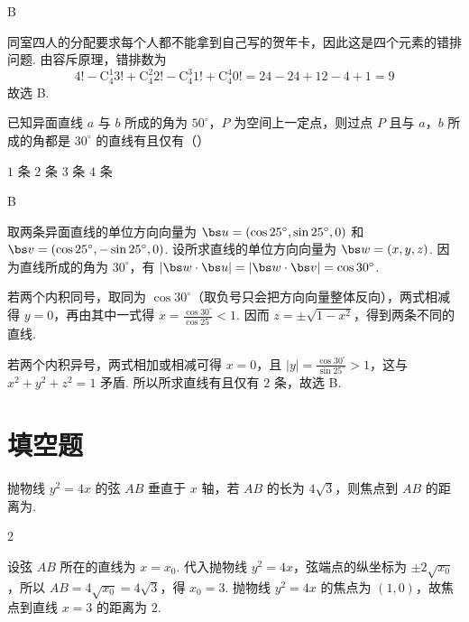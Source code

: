 \begin{answer}
B
\end{answer}

\begin{solution}
同室四人的分配要求每个人都不能拿到自己写的贺年卡，因此这是四个元素的错排问题. 由容斥原理，错排数为
\[
4!-\mathrm C_4^1 3!+\mathrm C_4^2 2!-\mathrm C_4^3 1!+\mathrm C_4^4 0!=24-24+12-4+1=9
\]
故选 B.
\end{solution}

\begin{problem}
已知异面直线 \(a\) 与 \(b\) 所成的角为 \(50^{\circ}\)，\(P\) 为空间上一定点，则过点 \(P\) 且与 \(a\)，\(b\) 所成的角都是 \(30^{\circ}\) 的直线有且仅有（\quad）

\choices
    {\(1\) 条}
    {\(2\) 条}
    {\(3\) 条}
    {\(4\) 条}
\end{problem}

\begin{answer}
B
\end{answer}

\begin{solution}
取两条异面直线的单位方向向量为
\(\bs u=(\cos25^\circ,\sin25^\circ,0)\) 和
\(\bs v=(\cos25^\circ,-\sin25^\circ,0)\). 设所求直线的单位方向向量为
\(\bs w=(x,y,z)\). 因为直线所成的角为 \(30^\circ\)，有
\(\lvert\bs w\cdot\bs u\rvert=\lvert\bs w\cdot\bs v\rvert=\cos30^\circ\).

若两个内积同号，取同为 \(\cos30^\circ\)（取负号只会把方向向量整体反向），两式相减得 \(y=0\)，再由其中一式得
\(x=\frac{\cos30^\circ}{\cos25^\circ}<1\). 因而
\(z=\pm\sqrt{1-x^2}\)，得到两条不同的直线.

若两个内积异号，两式相加或相减可得
\(x=0\)，且 \(\lvert y\rvert=\frac{\cos30^\circ}{\sin25^\circ}>1\)，这与
\(x^2+y^2+z^2=1\) 矛盾. 所以所求直线有且仅有 \(2\) 条，故选 B.
\end{solution}

\section{填空题}

\begin{problem}
抛物线 \(y^{2} = 4x\) 的弦 \(AB\) 垂直于 \(x\) 轴，若 \(AB\) 的长为 \(4\sqrt{3}\)，则焦点到 \(AB\) 的距离为\fillinblank{}.
\end{problem}

\begin{answer}
2
\end{answer}

\begin{solution}
设弦 \(AB\) 所在的直线为 \(x=x_0\). 代入抛物线
\(y^2=4x\)，弦端点的纵坐标为 \(\pm2\sqrt{x_0}\)，所以
\(AB=4\sqrt{x_0}=4\sqrt3\)，得 \(x_0=3\). 抛物线
\(y^2=4x\) 的焦点为 \((1,0)\)，故焦点到直线 \(x=3\) 的距离为 \(2\).
\end{solution}


